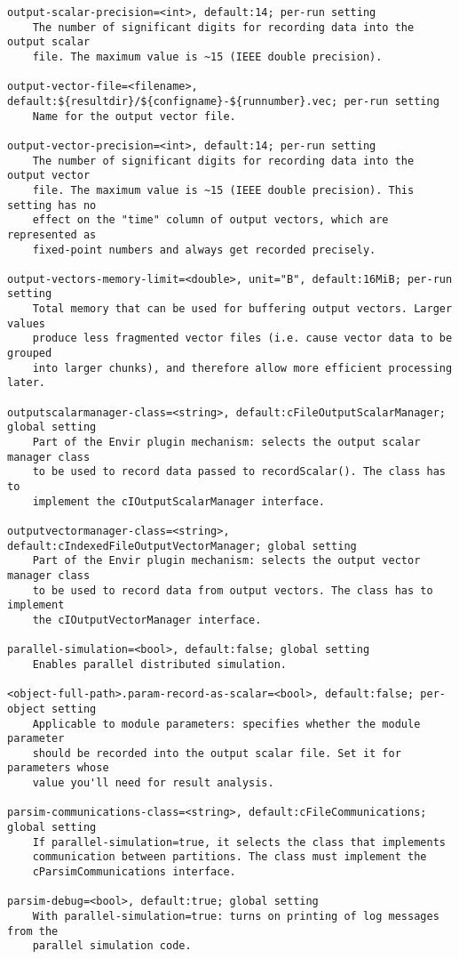 \begin{verbatim}
output-scalar-precision=<int>, default:14; per-run setting
    The number of significant digits for recording data into the output scalar
    file. The maximum value is ~15 (IEEE double precision).

output-vector-file=<filename>, default:${resultdir}/${configname}-${runnumber}.vec; per-run setting
    Name for the output vector file.

output-vector-precision=<int>, default:14; per-run setting
    The number of significant digits for recording data into the output vector
    file. The maximum value is ~15 (IEEE double precision). This setting has no
    effect on the "time" column of output vectors, which are represented as
    fixed-point numbers and always get recorded precisely.

output-vectors-memory-limit=<double>, unit="B", default:16MiB; per-run setting
    Total memory that can be used for buffering output vectors. Larger values
    produce less fragmented vector files (i.e. cause vector data to be grouped
    into larger chunks), and therefore allow more efficient processing later.

outputscalarmanager-class=<string>, default:cFileOutputScalarManager; global setting
    Part of the Envir plugin mechanism: selects the output scalar manager class
    to be used to record data passed to recordScalar(). The class has to
    implement the cIOutputScalarManager interface.

outputvectormanager-class=<string>, default:cIndexedFileOutputVectorManager; global setting
    Part of the Envir plugin mechanism: selects the output vector manager class
    to be used to record data from output vectors. The class has to implement
    the cIOutputVectorManager interface.

parallel-simulation=<bool>, default:false; global setting
    Enables parallel distributed simulation.

<object-full-path>.param-record-as-scalar=<bool>, default:false; per-object setting
    Applicable to module parameters: specifies whether the module parameter
    should be recorded into the output scalar file. Set it for parameters whose
    value you'll need for result analysis.

parsim-communications-class=<string>, default:cFileCommunications; global setting
    If parallel-simulation=true, it selects the class that implements
    communication between partitions. The class must implement the
    cParsimCommunications interface.

parsim-debug=<bool>, default:true; global setting
    With parallel-simulation=true: turns on printing of log messages from the
    parallel simulation code.


\end{verbatim}
